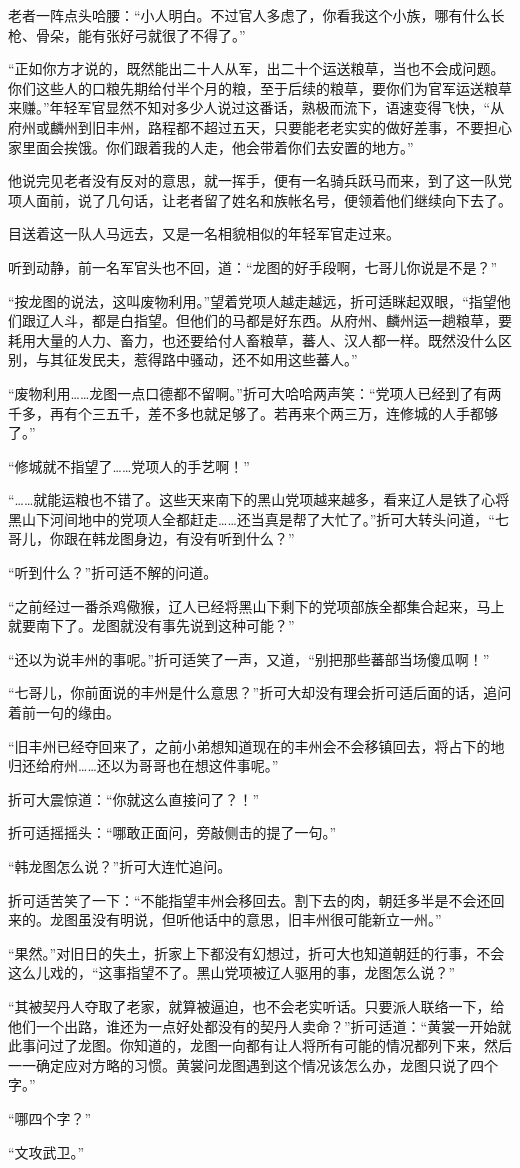 老者一阵点头哈腰：“小人明白。不过官人多虑了，你看我这个小族，哪有什么长枪、骨朵，能有张好弓就很了不得了。”

“正如你方才说的，既然能出二十人从军，出二十个运送粮草，当也不会成问题。你们这些人的口粮先期给付半个月的粮，至于后续的粮草，要你们为官军运送粮草来赚。”年轻军官显然不知对多少人说过这番话，熟极而流下，语速变得飞快，“从府州或麟州到旧丰州，路程都不超过五天，只要能老老实实的做好差事，不要担心家里面会挨饿。你们跟着我的人走，他会带着你们去安置的地方。”

他说完见老者没有反对的意思，就一挥手，便有一名骑兵跃马而来，到了这一队党项人面前，说了几句话，让老者留了姓名和族帐名号，便领着他们继续向下去了。

目送着这一队人马远去，又是一名相貌相似的年轻军官走过来。

听到动静，前一名军官头也不回，道：“龙图的好手段啊，七哥儿你说是不是？”

“按龙图的说法，这叫废物利用。”望着党项人越走越远，折可适眯起双眼，“指望他们跟辽人斗，都是白指望。但他们的马都是好东西。从府州、麟州运一趟粮草，要耗用大量的人力、畜力，也还要给付人畜粮草，蕃人、汉人都一样。既然没什么区别，与其征发民夫，惹得路中骚动，还不如用这些蕃人。”

“废物利用……龙图一点口德都不留啊。”折可大哈哈两声笑：“党项人已经到了有两千多，再有个三五千，差不多也就足够了。若再来个两三万，连修城的人手都够了。”

“修城就不指望了……党项人的手艺啊！”

“……就能运粮也不错了。这些天来南下的黑山党项越来越多，看来辽人是铁了心将黑山下河间地中的党项人全都赶走……还当真是帮了大忙了。”折可大转头问道，“七哥儿，你跟在韩龙图身边，有没有听到什么？”

“听到什么？”折可适不解的问道。

“之前经过一番杀鸡儆猴，辽人已经将黑山下剩下的党项部族全都集合起来，马上就要南下了。龙图就没有事先说到这种可能？”

“还以为说丰州的事呢。”折可适笑了一声，又道，“别把那些蕃部当场傻瓜啊！”

“七哥儿，你前面说的丰州是什么意思？”折可大却没有理会折可适后面的话，追问着前一句的缘由。

“旧丰州已经夺回来了，之前小弟想知道现在的丰州会不会移镇回去，将占下的地归还给府州……还以为哥哥也在想这件事呢。”

折可大震惊道：“你就这么直接问了？！”

折可适摇摇头：“哪敢正面问，旁敲侧击的提了一句。”

“韩龙图怎么说？”折可大连忙追问。

折可适苦笑了一下：“不能指望丰州会移回去。割下去的肉，朝廷多半是不会还回来的。龙图虽没有明说，但听他话中的意思，旧丰州很可能新立一州。”

“果然。”对旧日的失土，折家上下都没有幻想过，折可大也知道朝廷的行事，不会这么儿戏的，“这事指望不了。黑山党项被辽人驱用的事，龙图怎么说？”

“其被契丹人夺取了老家，就算被逼迫，也不会老实听话。只要派人联络一下，给他们一个出路，谁还为一点好处都没有的契丹人卖命？”折可适道：“黄裳一开始就此事问过了龙图。你知道的，龙图一向都有让人将所有可能的情况都列下来，然后一一确定应对方略的习惯。黄裳问龙图遇到这个情况该怎么办，龙图只说了四个字。”

“哪四个字？”

“文攻武卫。”

